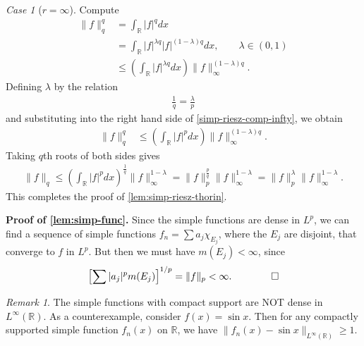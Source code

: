 \documentclass[12pt,reqno]{amsart}
\numberwithin{equation}{section}  %
\numberwithin{figure}{section}
\newcommand{\rr}{\mathbb{R}}
\theoremstyle{plain}
\theoremstyle{definition}
\theoremstyle{remark}
\newtheorem{remark}{Remark}
\newtheorem{case}{Case}
\begin{document}
%
%
\begin{case}[$r = \infty$]
Compute
%
\begin{equation}
	\label{simp-riesz-comp-infty}
	\begin{split}
		\| f \|_{q}^{q}
		& = \int_{\rr} | f |^{q}dx
		\\
		& = \int_{\rr} | f |^{\lambda q} | f |^{(1-\lambda)q} dx, \qquad \lambda \in
		(0,1)
		\\
		& \le \left( \int_{\rr} | f |^{\lambda q} dx \right)
		\| f \|_{\infty}^{(1 - \lambda)q}.
	\end{split}
\end{equation}
Defining $\lambda$ by the relation
%
%
\begin{equation*}
	\begin{split}
		\frac{1}{q} = \frac{\lambda}{p}
	\end{split}
\end{equation*}
and substituting into the right hand side of \eqref{simp-riesz-comp-infty}, we obtain
%
%
\begin{equation*}
	\begin{split}
		\| f \|_{q}^{q}
		& \le \left( \int_{\rr} | f |^{p} dx \right) \|f \|_{\infty}^{(1 -
		\lambda)q}.
	\end{split}
\end{equation*}
%
%
Taking $q$th roots of both sides gives
%
%
\begin{equation*}
	\begin{split}
		\|f\|_{q} \le \left( \int_{\rr} | f |^{p} dx \right)^{\frac{1}{q}}
		\|f \|_{\infty}^{1 -\lambda} = \|f\|_{p}^{\frac{p}{q}}
		\|f\|_{\infty}^{1 - \lambda} = \|f\|_{p}^{\lambda} \|f\|_{\infty}^{1-
		\lambda}.
	\end{split}
\end{equation*}
%
%
This completes the proof of \autoref{lem:simp-riesz-thorin}.	\qquad \qedsymbol		
\end{case}
%
%
{\bf Proof of \autoref{lem:simp-func}.}
Since the simple functions are dense in $L^p$, we can find a sequence of simple
functions $f_n=\sum a_{j} \chi_{E_j}$, where the $E_j$ are disjoint, that
converge to $f$ in $L^p$. But then we must have $m(E_j) < \infty$, since
%
%
\begin{equation*}
\begin{split}
	\left[ \sum | a_j |^{p} m(E_j) \right]^{1/p} =  \|f\|_{p} < \infty. \qquad
	\qed
\end{split}
\end{equation*}
%
%
%
%
\begin{framed}
\begin{remark}
	\label{rem:density}
	The simple functions with compact support are NOT dense in $L^\infty(\rr)$. As a
	counterexample, consider $f(x) = \sin x$. Then for any compactly supported simple
	function $f_n(x)$ on $\rr$, we have $\| f_n(x) - \sin x \|_{L^\infty(\rr)} \ge 1$.
\end{remark}
\end{framed}
\end{document}
